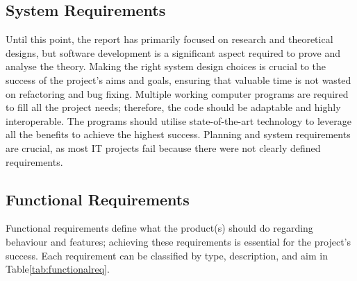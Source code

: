 \begin{center}
\section{System Requirements}
\label{sec:system}
\end{center}

Until this point, the report has primarily focused on research and theoretical designs, but software development is a significant aspect required to prove and analyse the theory. Making the right system design choices is crucial to the success of the project's aims and goals, ensuring that valuable time is not wasted on refactoring and bug fixing. Multiple working computer programs are required to fill all the project needs; therefore, the code should be adaptable and highly interoperable. The programs should utilise state-of-the-art technology to leverage all the benefits to achieve the highest success. Planning and system requirements are crucial, as most IT projects fail because there were not clearly defined requirements\cite{functional_requirements}.

\subsection{Functional Requirements}
\label{sec:requirements}
Functional requirements define what the product(s) should do regarding behaviour and features; achieving these requirements is essential for the project's success. Each requirement can be classified by type, description, and aim in Table\ref{tab:functionalreq}.
\pagebreak

